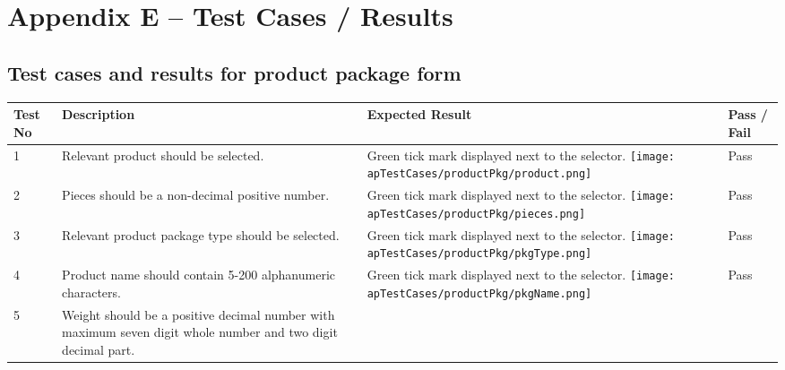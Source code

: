 \documentclass[12pt]{report}
\begin{document}
\setcounter{chapter}{5}
\setcounter{section}{0}
\setcounter{figure}{0}
\setcounter{table}{0}
\chapter*{\Huge Appendix E – Test Cases / Results}

\section{Test cases and results for product package form}

\begin{longtable}{ | p{1cm} | p{5cm} | p{5cm} | p{2cm} | }
	\hline
	\bf{Test No} & \bf{Description} & \bf{Expected Result} & \bf{Pass / Fail} \\
	\hline
	1
	             &
	Relevant product should be selected.
	             &
	Green tick mark displayed next to the selector.\newline
	\texttt{[image: apTestCases/productPkg/product.png]}
	             &
	Pass                                                                      \\
	\hline
	2
	             &
	Pieces should be a non-decimal positive number.
	             &
	Green tick mark displayed next to the selector.\newline
	\texttt{[image: apTestCases/productPkg/pieces.png]}
	             &
	Pass                                                                      \\
	\hline
	3
	             &
	Relevant product package type should be selected.
	             &
	Green tick mark displayed next to the selector.\newline
	\texttt{[image: apTestCases/productPkg/pkgType.png]}
	             &
	Pass                                                                      \\
	\hline
	4
	             &
	Product name should contain 5-200 alphanumeric characters.
	             &
	Green tick mark displayed next to the selector.\newline
	\texttt{[image: apTestCases/productPkg/pkgName.png]}
	             &
	Pass                                                                      \\
	\hline
	5
	             &
	Weight should be a positive decimal number with maximum seven digit whole number and two digit decimal part.

\end{longtable}
\end{document}
